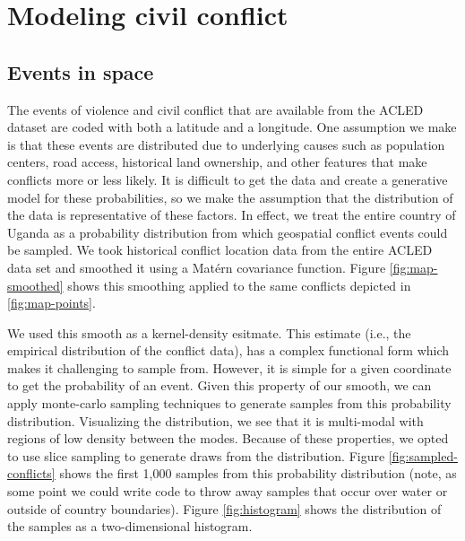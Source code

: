 \documentclass{article} %
\begin{document}
\section*{Modeling civil conflict}

\subsection*{Events in space}

The events of violence and civil conflict that are available from the ACLED dataset are coded with both a latitude and a longitude. One assumption we make is that these events are distributed due to underlying causes such as population centers, road access, historical land ownership, and other features that make conflicts more or less likely. It is difficult to get the data and create a generative model for these probabilities, so we make the assumption that the distribution of the data is representative of these factors. In effect, we treat the entire country of Uganda as a probability distribution from which geospatial conflict events could be sampled.  We took historical conflict location data from the entire ACLED data set and smoothed it using a Mat\'{e}rn covariance function.  Figure \ref{fig:map-smoothed} shows this smoothing applied to the same conflicts depicted in \ref{fig:map-points}.

We used this smooth as a kernel-density esitmate. This estimate (i.e., the empirical distribution of the conflict data), has a complex functional form which makes it challenging to sample from. However, it is simple for a given coordinate to get the probability of an event. Given this property of our smooth, we can apply monte-carlo sampling techniques to generate samples from this probability distribution. Visualizing the distribution, we see that it is multi-modal with regions of low density between the modes. Because of these properties, we opted to use slice sampling to generate draws from the distribution. Figure \ref{fig:sampled-conflicts} shows the first 1,000 samples from this probability distribution (note, as some point we could write code to throw away samples that occur over water or outside of country boundaries). Figure \ref{fig:histogram} shows the distribution of the samples as a two-dimensional histogram.
\end{document}
